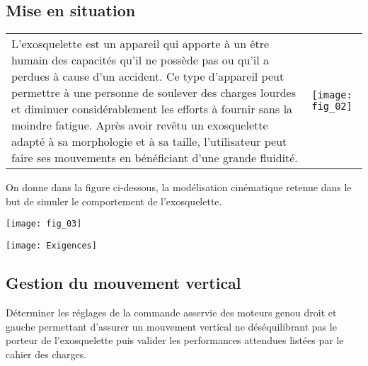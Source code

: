 \def\columnseprulecolor{\color{bleuxp}}
\setlength{\columnseprule}{0.4pt} 
\setcounter{numques}{0}
\ifprof
\else
\begin{multicols}{2}
\fi
\section*{Mise en situation}
\ifprof
\else

\noindent
\begin{tabular}{m{.6\linewidth}m{.3\linewidth}}
L’exosquelette est un appareil qui apporte à un être humain des capacités qu’il ne possède pas ou qu’il a perdues à cause d’un accident. Ce type d’appareil peut permettre à une personne de soulever des charges lourdes et diminuer considérablement les efforts à fournir sans la moindre fatigue. Après avoir revêtu un exosquelette adapté à sa morphologie et à sa taille, l’utilisateur peut faire ses mouvements en bénéficiant
d’une grande fluidité.
& 
\texttt{[image: fig\_02]}

\end{tabular}



\begin{center}
\end{center}

On donne dans la figure ci-dessous, la modélisation cinématique retenue dans le but de simuler le comportement de l'exosquelette.


\begin{center}
\texttt{[image: fig\_03]}
\end{center}

\begin{center}
\texttt{[image: Exigences]}
\end{center}
\fi

\subsection*{Gestion du mouvement vertical}

\begin{obj}
Déterminer les réglages de la commande asservie des moteurs genou droit et gauche permettant d’assurer un mouvement vertical ne déséquilibrant pas le porteur de l’exosquelette puis valider les performances attendues listées par le cahier des charges.
\end{obj}



\end{multicols}
